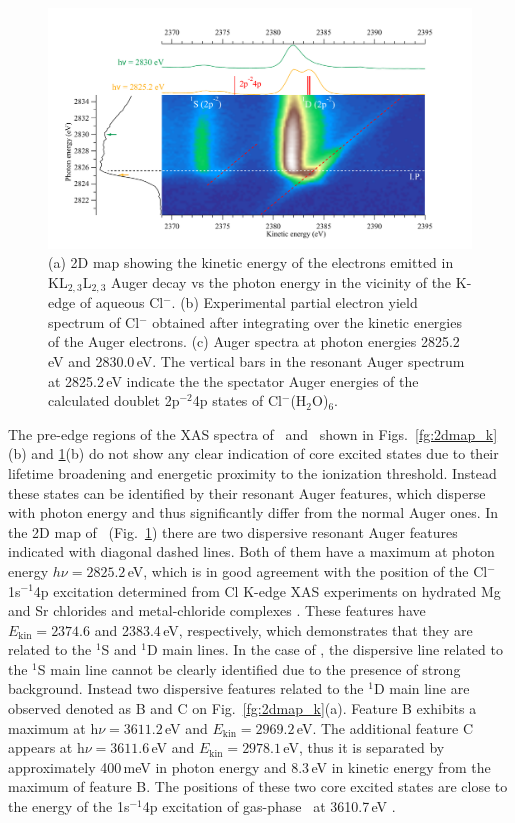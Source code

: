 \begin{figure}[h!]
\centering
\includegraphics[scale=0.55]{figures/cl_2dmap.pdf}
\caption{(a) 2D map showing the kinetic energy of the electrons emitted in KL$_{2,3}$L$_{2,3}$ Auger decay vs the photon energy in the vicinity of the K-edge of aqueous Cl$^{-}$. 
(b) Experimental partial electron yield spectrum of Cl$^{-}$ obtained after integrating over the kinetic energies of the Auger electrons. 
(c) Auger spectra at photon energies 2825.2\,eV and 2830.0\,eV. The vertical bars in the resonant Auger spectrum at 2825.2\,eV indicate the the spectator Auger energies of the calculated doublet 2p$^{-2}$4p states of Cl$^{-}$(H$_2$O)$_6$.}
\label{fg:2dmap_cl}
\end{figure}


The pre-edge regions of the XAS spectra of \ki~and \cli~shown in Figs.\ \ref{fg:2dmap_k}(b) and \ref{fg:2dmap_cl}(b) do not show any clear indication of core excited states due to their lifetime broadening and energetic proximity to the ionization threshold. Instead these states can be identified by their resonant Auger features, which disperse with photon energy and thus significantly differ from the normal Auger ones. In the 2D map of \cli~(Fig.\ \ref{fg:2dmap_cl}) there are two dispersive resonant Auger features indicated with diagonal dashed lines. Both of them have a maximum at photon energy $h\nu =  2825.2$\,eV, which is in good agreement with the position of the Cl$^{-}$ 1s$^{-1}$4p excitation determined from Cl K-edge XAS experiments on hydrated Mg and Sr chlorides\citep{sugiura82:681} and metal-chloride complexes \citep{shadle95:2259}. These features have $E_{\text{kin}} = 2374.6$ and 2383.4\,eV, respectively, which demonstrates that they are related to the $^1$S and $^1$D main lines.
In the case of \ki, the dispersive line related to the $^1$S main line cannot be clearly identified due to the presence of strong background. Instead two dispersive features related to the $^1$D main line are observed denoted as B and C on Fig.\ \ref{fg:2dmap_k}(a). Feature B exhibits a maximum at h$\nu = 3611.2$\,eV and $E_{\text{kin}} = 2969.2$\,eV. The additional feature C appears at h$\nu = 3611.6$\,eV and $E_{\text{kin}} = 2978.1$\,eV, thus it is separated by approximately 400\,meV in photon energy and 8.3\,eV in kinetic energy from the maximum of feature B. The positions of these two core excited states are close to the energy of the 1s$^{-1}$4p excitation of gas-phase \ki~at 3610.7\,eV \citep{hertlein06:062715}.


